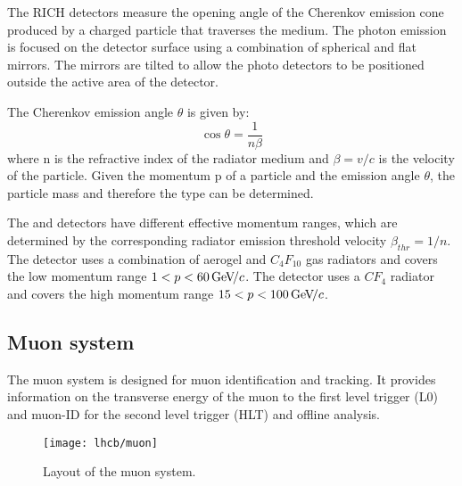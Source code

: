 The RICH detectors measure the opening angle of the Cherenkov emission cone
produced by a charged particle that traverses the medium. The photon emission
is focused on the detector surface using a combination of spherical and flat
mirrors. The mirrors are tilted to allow the photo detectors to be positioned
outside the active area of the detector.

The Cherenkov emission angle $\theta$ is given by:
$$\cos\theta = \frac{1}{n\beta}$$
\noindent where n is the refractive index of the radiator medium and 
$\beta = v/c$ is the velocity of the particle. Given the momentum p of a
particle and the emission angle $\theta$, the particle mass and therefore the
type can be determined.

The \richone and \richtwo detectors have different effective momentum ranges,
which are determined by the corresponding radiator emission threshold velocity
$\beta_{thr} = 1/n$. The \richone detector uses a combination of aerogel and
$C_4F_{10}$ gas radiators and covers the low momentum range $1<p<60 {\mathrm{\,Ge\kern -0.1em V\!/}c}$. The
\richtwo detector uses a $CF_4$ radiator and covers the high momentum range $15
< p < 100 {\mathrm{\,Ge\kern -0.1em V\!/}c}$.

\subsection{Muon system}

The \lhcb muon system is designed for muon identification and tracking. It
provides information on the transverse energy of the muon to the first level
trigger (L0) and muon-ID for the second level trigger (HLT) and offline
analysis.

\begin{figure}[tb]
\begin{center}
\texttt{[image: lhcb/muon]}
\end{center}
\caption{\small Layout of the muon system.}
\label{fig:muon}
\end{figure}


